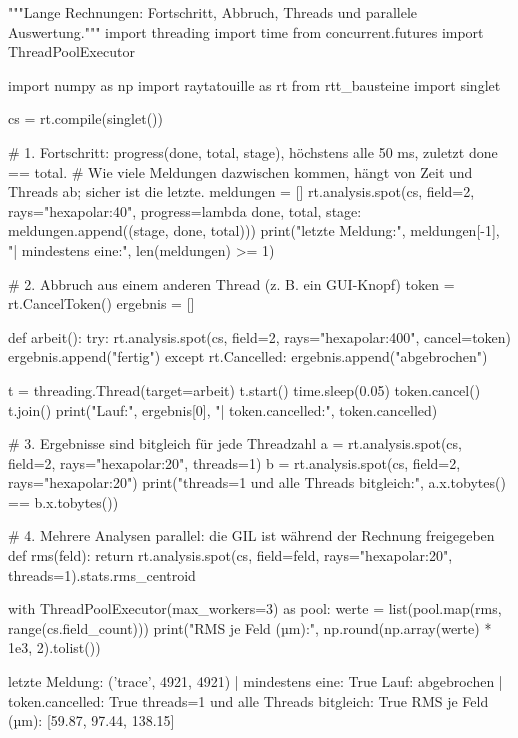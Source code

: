\documentclass[11pt,a4paper,openany]{book}
\DeclareRobustCommand{\code}[1]{\texttt{\directlua{rttcode("\luaescapestring{\detokenize{#1}}")}}}
\begin{document}
\begin{pycode}[title={\code{ex17_nebenlaeufigkeit.py}}]
"""Lange Rechnungen: Fortschritt, Abbruch, Threads und parallele Auswertung."""
import threading
import time
from concurrent.futures import ThreadPoolExecutor

import numpy as np
import raytatouille as rt
from rtt_bausteine import singlet

cs = rt.compile(singlet())

# 1. Fortschritt: progress(done, total, stage), höchstens alle 50 ms, zuletzt done == total.
#    Wie viele Meldungen dazwischen kommen, hängt von Zeit und Threads ab; sicher ist die letzte.
meldungen = []
rt.analysis.spot(cs, field=2, rays="hexapolar:40",
                 progress=lambda done, total, stage: meldungen.append((stage, done, total)))
print("letzte Meldung:", meldungen[-1], "| mindestens eine:", len(meldungen) >= 1)

# 2. Abbruch aus einem anderen Thread (z. B. ein GUI-Knopf)
token = rt.CancelToken()
ergebnis = []

def arbeit():
    try:
        rt.analysis.spot(cs, field=2, rays="hexapolar:400", cancel=token)
        ergebnis.append("fertig")
    except rt.Cancelled:
        ergebnis.append("abgebrochen")

t = threading.Thread(target=arbeit)
t.start()
time.sleep(0.05)
token.cancel()
t.join()
print("Lauf:", ergebnis[0], "| token.cancelled:", token.cancelled)

# 3. Ergebnisse sind bitgleich für jede Threadzahl
a = rt.analysis.spot(cs, field=2, rays="hexapolar:20", threads=1)
b = rt.analysis.spot(cs, field=2, rays="hexapolar:20")
print("threads=1 und alle Threads bitgleich:", a.x.tobytes() == b.x.tobytes())

# 4. Mehrere Analysen parallel: die GIL ist während der Rechnung freigegeben
def rms(feld):
    return rt.analysis.spot(cs, field=feld, rays="hexapolar:20", threads=1).stats.rms_centroid

with ThreadPoolExecutor(max_workers=3) as pool:
    werte = list(pool.map(rms, range(cs.field_count)))
print("RMS je Feld (µm):", np.round(np.array(werte) * 1e3, 2).tolist())
\end{pycode}
\begin{ausgabe}
letzte Meldung: ('trace', 4921, 4921) | mindestens eine: True
Lauf: abgebrochen | token.cancelled: True
threads=1 und alle Threads bitgleich: True
RMS je Feld (µm): [59.87, 97.44, 138.15]
\end{ausgabe}
\end{document}
